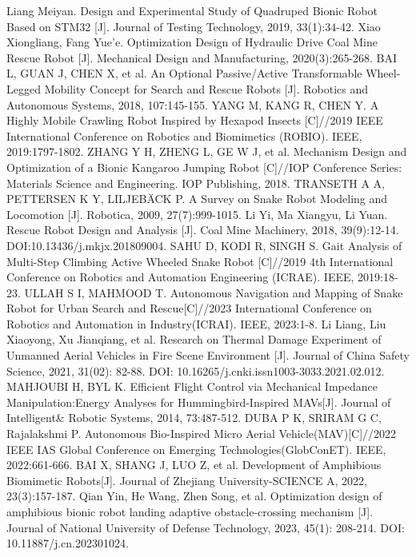 \documentclass[conference]{IEEEtran}
\begin{document}
\begin{thebibliography}{00}
 Liang Meiyan. Design and Experimental Study of Quadruped Bionic Robot Based on STM32 [J]. Journal of Testing Technology, 2019, 33(1):34-42.
 Xiao Xiongliang, Fang Yue'e. Optimization Design of Hydraulic Drive Coal Mine Rescue Robot [J]. Mechanical Design and Manufacturing, 2020(3):265-268.
 BAI L, GUAN J, CHEN X, et al. An Optional Passive/Active Transformable Wheel-Legged Mobility Concept for Search and Rescue Robots [J]. Robotics and Autonomous Systems, 2018, 107:145-155.
 YANG M, KANG R, CHEN Y. A Highly Mobile Crawling Robot Inspired by Hexapod Insects [C]//2019 IEEE International Conference on Robotics and Biomimetics (ROBIO). IEEE, 2019:1797-1802.
 ZHANG Y H, ZHENG L, GE W J, et al. Mechanism Design and Optimization of a Bionic Kangaroo Jumping Robot [C]//IOP Conference Series: Materials Science and Engineering. IOP Publishing, 2018.
 TRANSETH A A, PETTERSEN K Y, LILJEBÄCK P. A Survey on Snake Robot Modeling and Locomotion [J]. Robotica, 2009, 27(7):999-1015.
 Li Yi, Ma Xiangyu, Li Yuan. Rescue Robot Design and Analysis [J]. Coal Mine Machinery, 2018, 39(9):12-14. DOI:10.13436/j.mkjx.201809004.
 SAHU D, KODI R, SINGH S. Gait Analysis of Multi-Step Climbing Active Wheeled Snake Robot [C]//2019 4th International Conference on Robotics and Automation Engineering (ICRAE). IEEE, 2019:18-23.
 ULLAH S I, MAHMOOD T. Autonomous Navigation and Mapping of Snake Robot for Urban Search and Rescue[C]//2023 International Conference on Robotics and Automation in Industry(ICRAI). IEEE, 2023:1-8.
 Li Liang, Liu Xiaoyong, Xu Jianqiang, et al. Research on Thermal Damage Experiment of Unmanned Aerial Vehicles in Fire Scene Environment [J]. Journal of China Safety Science, 2021, 31(02): 82-88. DOI: 10.16265/j.cnki.issn1003-3033.2021.02.012.
 MAHJOUBI H, BYL K. Efficient Flight Control via Mechanical Impedance Manipulation:Energy Analyses for Hummingbird-Inspired MAVs[J]. Journal of Intelligent\& Robotic Systems, 2014, 73:487-512.
 DUBA P K, SRIRAM G C, Rajalakshmi P. Autonomous Bio-Inspired Micro Aerial Vehicle(MAV)[C]//2022 IEEE IAS Global Conference on Emerging Technologies(GlobConET). IEEE, 2022:661-666.
 BAI X, SHANG J, LUO Z, et al. Development of Amphibious Biomimetic Robots[J]. Journal of Zhejiang University-SCIENCE A, 2022, 23(3):157-187.
 Qian Yin, He Wang, Zhen Song, et al. Optimization design of amphibious bionic robot landing adaptive obstacle-crossing mechanism [J]. Journal of National University of Defense Technology, 2023, 45(1): 208-214. DOI: 10.11887/j.cn.202301024.

\end{thebibliography}
\end{document}
